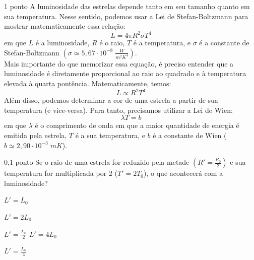 \documentclass{../lista}
\begin{document}
	\begin{questao}{1 ponto}
		A luminosidade das estrelas depende tanto em seu tamanho quanto em sua temperatura. Nesse sentido, podemos usar a Lei de Stefan-Boltzmann para mostrar matematicamente essa relação:
		\begin{equation}
			L=4 \pi R^2 \sigma T^4
		\end{equation}
		em que $L$ é a luminosidade, $R$ é o raio, $T$ é a temperatura, e $\sigma$ é a constante de Stefan-Boltzmann $\left( \sigma \simeq 5,67 \cdot 10^{-8} \; \frac{W}{m^2K^4} \right)$. \\
		Mais importante do que memorizar essa equação, é preciso entender que a luminosidade é diretamente proporcional ao raio ao quadrado e à temperatura elevada à quarta pontência. Matematicamente, temos:
		\begin{equation}
			L \propto R^2 T^4
		\end{equation}
		Além disso, podemos determinar a cor de uma estrela a partir de sua temperatura (e vice-versa). Para tanto, precisamos utilizar a Lei de Wien:
		\begin{equation}
			\lambda T = b
		\end{equation}
		em que $\lambda$ é o comprimento de onda em que a maior quantidade de energia é emitida pela estrela, $T$ é a sua temperatura, e $b$ é a constante de Wien ($b \simeq 2,90 \cdot 10^{-3} \; mK$).

		\begin{pergunta}{0,1 ponto}
			Se o raio de uma estrela for reduzido pela metade $\left( R'=\frac{R_0}{2} \right)$ e sua temperatura for multiplicada por 2 ($T'=2T_0$), o que acontecerá com a luminosidade?


			\begin{alternativas}
				\item $L'=L_0$
				\item $L'=2L_0$
				\item $L'=\frac{L_0}{2}$
				\alternativaMarcada $L'=4L_0$
				\item $L'=\frac{L_0}{4}$
			\end{alternativas}
		\end{pergunta}


\end{questao}
\end{document}
